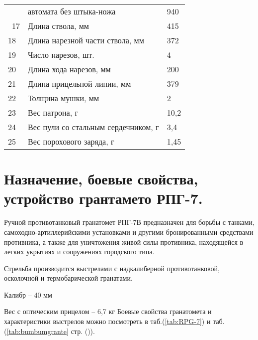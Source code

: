 \documentclass[12pt,a4paper]{report}
\begin{document}
\begin{table}[h!]
\begin{center}
\begin{tabular}{|l|p{11cm}|l|}
	   &	автомата без штыка-ножа	&940\\\
	 17&	Длина ствола, мм	&415\\
	 18&	Длина нарезной части ствола, мм	&372\\
	 19&	Число нарезов, шт.	&4\\
	 20&	Длина хода нарезов, мм	&200\\
	 21&    Длина прицельной линии, мм	&379\\
	 22&	Толщина мушки, мм	&2\\
	 23&	Вес патрона, г	&10,2\\
	 24&	Вес пули со стальным сердечником, г&	3,4\\
	 25&	Вес порохового заряда, г	&1,45\\
	 \hline
\end{tabular}
\end{center}
\end{table}
\newpage

\section{Назначение, боевые свойства, устройство грантамето РПГ-7.}

Ручной противотанковый гранатомет РПГ-7В предназначен для борьбы с танками, самоходно-артиллерийскими установками и другими бронированными средствами противника, а также для уничтожения живой силы противника, находящейся в легких укрытиях и сооружениях городского типа.

Стрельба производится выстрелами с надкалиберной противотанковой, осколочной и термобарической гранатами.

Калибр – 40 мм

Вес с оптическим прицелом – 6,7 кг
Боевые свойства гранатомета и характеристики выстрелов можно посмотреть в  таб.(\ref{tab:RPG-7}) и таб.(\ref{tab:bumbumgrante} стр. (\pageref{tab:bumbumgrante})).
\end{document}
